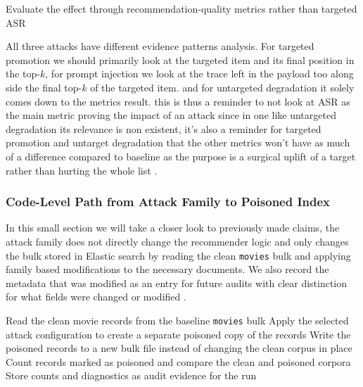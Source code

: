 \begin{algorithm}[H]
\caption{Degrade selected document evidence}
Evaluate the effect through recommendation-quality metrics rather than targeted ASR\;
\end{algorithm}

All three attacks have different evidence patterns analysis. For targeted promotion we should primarily look at the targeted item and its final position in the top-$k$, for prompt injection we look at the trace left in the payload too along side the final top-$k$ of the targeted item. and for untargeted degradation it solely comes down to the metrics result. this is thus a reminder to not look at ASR as the main metric proving the impact of an attack since in one like untargeted degradation its relevance is non existent, it's also a reminder for targeted promotion and untarget degradation that the other metrics won't have as much of a difference compared to baseline as the purpose is a surgical uplift of a target rather than hurting the whole list \cite{ragpoisonlab_repo}.


\subsubsection{Code-Level Path from Attack Family to Poisoned Index}

In this small section we will take a closer look to previously made claims, the attack family does not directly change the recommender logic and only changes the bulk stored in Elastic search by reading the clean \texttt{movies} bulk and applying family based modifications to the necessary documents. We also record the metadata that was modified as an entry for future audits with clear distinction for what fields were changed or modified \cite{ragpoisonlab_repo}.

\begin{algorithm}[H]
\caption{Build poisoned movie corpus}
Read the clean movie records from the baseline \texttt{movies} bulk\;
Apply the selected attack configuration to create a separate poisoned copy of the records\;
Write the poisoned records to a new bulk file instead of changing the clean corpus in place\;
Count records marked as poisoned and compare the clean and poisoned corpora\;
Store counts and diagnostics as audit evidence for the run\;
\end{algorithm}

